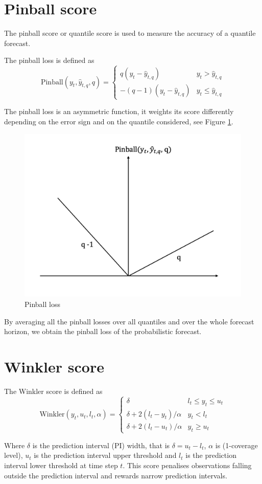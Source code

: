\section{Pinball score}\label{pinball}
The pinball score or quantile score is used to measure the accuracy of a quantile forecast.
\begin{definition}
    The pinball loss is defined as
    $$
    \mathrm{Pinball}(y_{t},\hat{y}_{t,q},q)=
\begin{cases}
q(y_{t}-\hat{y}_{t,q}) & y_t > \hat{y}_{t,q} \\
-(q-1)(y_{t}-\hat{y}_{t,q}) & y_t \leq \hat{y}_{t,q}
\end{cases}
$$
\end{definition}
The pinball loss is an asymmetric function, it weights its score differently depending on the error sign and on the quantile considered, see Figure \ref{fig:pinball}.
\begin{figure}
    \includegraphics[width=\textwidth]{images/pinball_loss.png}
    \caption{Pinball loss}
    \label{fig:pinball}
  \end{figure}
By averaging all the pinball losses over all quantiles and over the whole forecast horizon, we obtain the pinball loss of the probabilistic forecast.
\section{Winkler score}
\begin{definition}
    The Winkler score is defined as
    $$
    \mathrm{Winkler}(y_t,  u_{t},l_{t},\alpha)=\begin{cases}
        \delta & l_{t}\leq y_{t}\leq u_{t}\\
        \delta+2(l_{t}-y_{t})/\alpha & y_{t}< l_{t}\\
        \delta+2(l_{t}-u_{t})/\alpha & y_{t} \geq u_{t}
    \end{cases}
    $$
\end{definition}
Where $\delta$ is the prediction interval (PI) width, that is $\delta=u_t-l_t$, $\alpha$ is (1-coverage level), $u_t$ is the prediction interval upper threshold and $l_t$ is the prediction interval lower threshold at time step $t$. This score penalises observations falling outside the prediction interval and rewards narrow prediction intervals.
